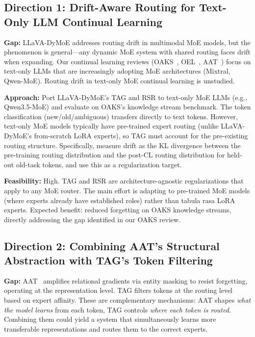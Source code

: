 \documentclass[11pt]{article}
\begin{document}
\subsection{Direction 1: Drift-Aware Routing for Text-Only LLM Continual Learning}

\textbf{Gap:} LLaVA-DyMoE addresses routing drift in multimodal MoE models, but the phenomenon is general---any dynamic MoE system with shared routing faces drift when expanding. Our continual learning reviews (OAKS~\cite{oaks}, OEL~\cite{oel}, AAT~\cite{aat}) focus on text-only LLMs that are increasingly adopting MoE architectures (Mixtral, Qwen-MoE). Routing drift in text-only MoE continual learning is unstudied.

\textbf{Approach:} Port LLaVA-DyMoE's TAG and RSR to text-only MoE LLMs (e.g., Qwen3.5-MoE) and evaluate on OAKS's knowledge stream benchmark. The token classification (new/old/ambiguous) transfers directly to text tokens. However, text-only MoE models typically have pre-trained expert routing (unlike LLaVA-DyMoE's from-scratch LoRA experts), so TAG must account for the pre-existing routing structure. Specifically, measure drift as the KL divergence between the pre-training routing distribution and the post-CL routing distribution for held-out old-task tokens, and use this as a regularization target.

\textbf{Feasibility:} High. TAG and RSR are architecture-agnostic regularizations that apply to any MoE router. The main effort is adapting to pre-trained MoE models (where experts already have established roles) rather than tabula rasa LoRA experts. Expected benefit: reduced forgetting on OAKS knowledge streams, directly addressing the gap identified in our OAKS review.

\subsection{Direction 2: Combining AAT's Structural Abstraction with TAG's Token Filtering}

\textbf{Gap:} AAT~\cite{aat} amplifies relational gradients via entity masking to resist forgetting, operating at the representation level. TAG filters tokens at the routing level based on expert affinity. These are complementary mechanisms: AAT shapes \textit{what the model learns} from each token, TAG controls \textit{where each token is routed}. Combining them could yield a system that simultaneously learns more transferable representations and routes them to the correct experts.
\end{document}
